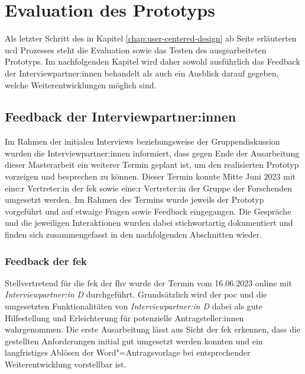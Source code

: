 \documentclass[a4paper,12pt,twoside]{scrreprt}
\begin{document}
\cleardoublepage
\chapter{Evaluation des Prototyps}
\label{chap:evaluation-prototyp}

Als letzter Schritt des in Kapitel \ref{chap:user-centered-design} ab Seite \pageref{chap:user-centered-design} erläuterten \acl{ucd} Prozesses steht die Evaluation sowie das Testen des ausgearbeiteten Prototyps. Im nachfolgenden Kapitel wird daher sowohl ausführlich das Feedback der Interviewpartner:innen behandelt als auch ein Ausblick darauf gegeben, welche Weiterentwicklungen möglich sind.

\section{Feedback der Interviewpartner:innen}
\label{sec:feedback-interviewpartner}

Im Rahmen der initialen Interviews beziehungsweise der Gruppendiskussion wurden die Interviewpartner:innen informiert, dass gegen Ende der Ausarbeitung dieser Masterarbeit ein weiterer Termin geplant ist, um den realisierten Prototyp vorzeigen und besprechen zu können. Dieser Termin konnte Mitte Juni 2023 mit eine:r Vertreter:in der \acl{fek} sowie eine:r Vertreter:in der Gruppe der Forschenden umgesetzt werden. Im Rahmen des Termins wurde jeweils der Prototyp vorgeführt und auf etwaige Fragen sowie Feedback eingegangen. Die Gespräche und die jeweiligen Interaktionen wurden dabei stichwortartig dokumentiert und finden sich zusammengefasst in den nachfolgenden Abschnitten wieder.

\subsection{Feedback der \acl{fek}}
\label{sub-sec:feedback-fek}

Stellvertretend für die \ac{fek} der \ac{fhv} wurde der Termin vom 16.06.2023 online mit \textit{Interviewpartner:in D} durchgeführt. Grundsätzlich wird der \ac{poc} und die umgesetzten Funktionalitäten von \textit{Interviewpartner:in D} dabei als gute Hilfestellung und Erleichterung für potenzielle Antragsteller:innen wahrgenommen. Die erste Ausarbeitung lässt aus Sicht der \acl{fek} erkennen, dass die gestellten Anforderungen initial gut umgesetzt werden konnten und ein langfristiges Ablösen der Word"=Antragsvorlage bei entsprechender Weiterentwicklung vorstellbar ist.
\end{document}
